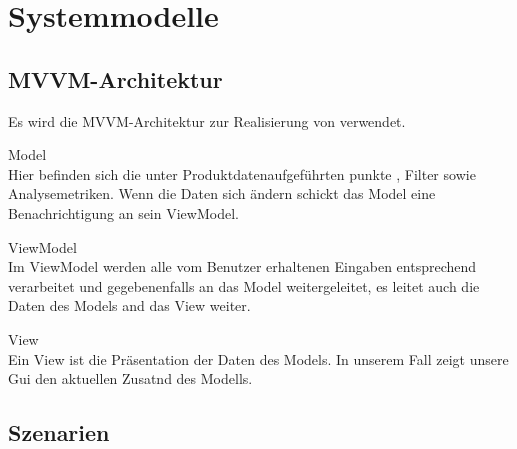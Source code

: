 \chapter{Systemmodelle}

\section{MVVM-Architektur}
\setcounter{counterKriterien}{0}

Es wird die MVVM-Architektur zur Realisierung von \projektTitel verwendet.

 Model \\
Hier befinden sich die unter Produktdatenaufgeführten punkte , Filter sowie Analysemetriken. Wenn die Daten
sich ändern schickt das Model eine Benachrichtigung an sein ViewModel.

 ViewModel \\
Im ViewModel werden alle vom Benutzer erhaltenen Eingaben entsprechend verarbeitet und
gegebenenfalls an das Model weitergeleitet, es leitet auch die Daten des Models and das View weiter.

 View \\
Ein View ist die Präsentation der Daten des Models. In unserem Fall zeigt unsere Gui den aktuellen Zusatnd des Modells.


\section{Szenarien}


